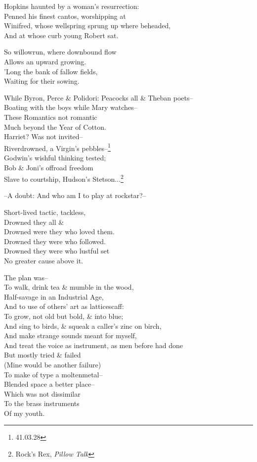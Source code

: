Hopkins haunted by a woman's resurrection: \\
Penned his finest cantos, worshipping at \\
Winifred, whose wellspring sprung up where beheaded, \\
And at whose curb young Robert sat.

So willowrun, where downbound flow \\
Allows an upward growing. \\
'Long the bank of fallow fields, \\
Waiting for their sowing.

While Byron, Perce \& Polidori: Peacocks all \& Theban poets-- \\
Boating with the boys while Mary watches-- \\
These Romantics not romantic \\
Much beyond the Year of Cotton. \\
Harriet? Was not invited-- \\
Riverdrowned, a Virgin's pebbles--\footnote{41.03.28} \\
Godwin's wishful thinking tested; \\
Bob \& Joni's offroad freedom \\
Slave to courtship, Hudson's Stetson...\footnote{Rock's Rex, \textit{Pillow Talk}}

--A doubt: And who am I to play at rockstar?--

Short-lived tactic, tackless, \\
Drowned they all \& \\
Drowned were they who loved them. \\
Drowned they were who followed. \\
Drowned they were who lustful set \\
No greater cause above it.

\secdiv

The plan was-- \\
To walk, drink tea \& mumble in the wood, \\
Half-savage in an Industrial Age, \\
And to use of others' art as latticescaff: \\
To grow, not old but bold, & into blue; \\
And sing to birds, \& squeak a caller's zinc on birch, \\
And make strange sounds meant for myself, \\
And treat the voice as instrument, as men before had done \\
But mostly tried \& failed \\
(Mine would be another failure) \\
To make of type a moltenmetal-- \\
Blended space a better place-- \\
Which was not dissimilar \\
To the brass instruments \\
Of my youth.

